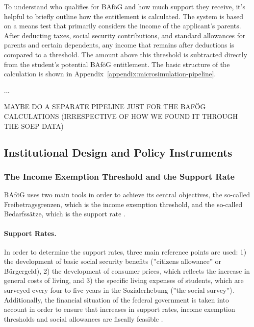 To understand who qualifies for BAföG and how much support they receive, it's helpful to briefly outline how the entitlement is calculated. The system is based on a means test that primarily considers the income of the applicant’s parents. After deducting taxes, social security contributions, and standard allowances for parents and certain dependents, any income that remains after deductions is compared to a threshold. The amount above this threshold is subtracted directly from the student’s potential BAföG entitlement. 
The basic structure of the calculation is shown in Appendix~\ref{appendix:microsimulation-pipeline}.

...

MAYBE DO A SEPARATE PIPELINE JUST FOR THE BAFÖG CALCULATIONS (IRRESPECTIVE OF HOW WE FOUND IT THROUGH THE SOEP DATA)

\subsection{Institutional Design and Policy Instruments} 
\label{section:institutional-design-and-policy-instruments}

\subsubsection{The Income Exemption Threshold and the Support Rate}
\label{subsection:the-income-exemption-threshold-and-the-support-rate}
BAföG uses two main tools in order to achieve its central objectives, the so-called Freibetragsgrenzen, which is the income exemption threshold, and the so-called Bedarfssätze, which is the support rate \citep{meier_bafog_2024}.

\paragraph{Support Rates.}
In order to determine the support rates, three main reference points are used: 1) the development of basic social security benefits (”citizens allowance” or Bürgergeld), 2) the development of consumer prices, which reflects the increase in general costs of living, and 3) the specific living expenses of students, which are surveyed every four to five years in the Sozialerhebung (”the social survey”). Additionally, the financial situation of the federal government is taken into account in order to ensure that increases in support rates, income exemption thresholds and social allowances are fiscally feasible \citep{meier_bafog_2024}.

